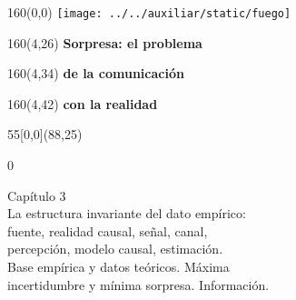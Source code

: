 \documentclass[shownotes,aspectratio=169]{beamer}
\begin{document}
\begin{frame}

\begin{textblock}{160}(0,0)
\texttt{[image: ../../auxiliar/static/fuego]}
\end{textblock}

\begin{textblock}{160}(4,26)
\LARGE \textcolor{black!5}{\fontsize{22}{0}\selectfont \textbf{Sorpresa: el problema}}
\end{textblock}
\begin{textblock}{160}(4,34)
\LARGE \textcolor{black!5}{\fontsize{22}{0}\selectfont \textbf{de la comunicación}}
\end{textblock}
\begin{textblock}{160}(4,42)
\LARGE \textcolor{black!5}{\fontsize{22}{0}\selectfont \textbf{con la realidad}}
\end{textblock}



\begin{textblock}{55}[0,0](88,25)
\begin{turn}{0}
\parbox{7cm}{\sloppy\setlength\parfillskip{0pt}
\textcolor{black!0}{Capítulo 3} \\
\small\textcolor{black!5}{\hspace{0.05cm}La estructura invariante del dato empírico:} \\
\small\textcolor{black!5}{\hspace{0.1cm}fuente, realidad causal, señal, canal,} \\ \small\textcolor{black!5}{\hspace{0.05cm}percepción, modelo causal, estimación.} \\
\small\textcolor{black!5}{\hspace{-0.15cm}Base empírica y datos teóricos. Máxima} \\
\small\textcolor{black!5}{\hspace{-0.35cm}incertidumbre y mínima sorpresa. Información.} \\
}
\end{turn}
\end{textblock}


\end{frame}
\end{document}
